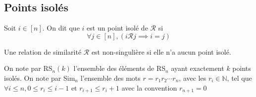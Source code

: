
\subsection{Points isolés}
\begin{definition}
	\begin{rm}
		Soit $i \in [n]$. On dit que $i$ est un point isolé de $\mathcal{R}$ si \\
		$$\forall j \in [n], (i\mathcal{R} j\implies i=j) $$
	\end{rm}
\end{definition}
\begin{definition}
	\begin{rm}
		Une relation de similarité $\mathcal{R}$ est non-singulière si elle n'a aucun point
		isolé.
	\end{rm}
\end{definition}
On note par RS$_{n}(k)$ l'ensemble des éléments de RS$_{n}$ ayant exactement $k$ points isolés.
On note par Sim$_{n}$ l'ensemble des mots $r=r_{1} r_{2}\cdots r_{n}$, avec les $r_{i}\in\mathbb{N}$, tel que \\
$\forall i\leq n, 0\leq r_{i} \leq i-1 \text{ et }  r_{i+1}\leq r_{i}+1$ avec la convention $r_{n+1}=0$
\newpage

